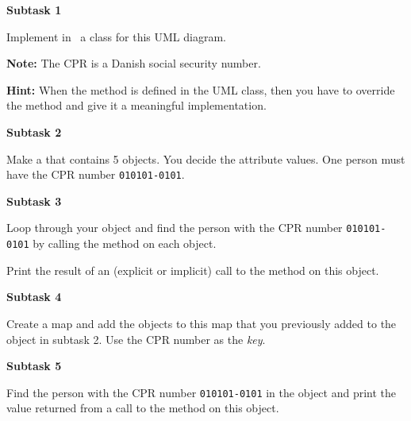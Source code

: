 \textbf{Subtask 1}

Implement in \csharp\ a class for this UML diagram.

\begin{center}
\end{center}

\textbf{Note:} The CPR is a Danish social security number.

\textbf{Hint:} When the  method is defined in the UML class, then you have to override the method and give it a meaningful implementation.

\textbf{Subtask 2}

Make a  that contains 5  objects. You decide the attribute values. One person must have the CPR number \texttt{010101-0101}.

\textbf{Subtask 3}

Loop through your  object and find the person with the CPR number \texttt{010101-0101} by calling the method  on each object.

Print the result of an (explicit or implicit) call to the  method on this object.

\textbf{Subtask 4}

Create a  map and add the  objects to this map that you previously added to the  object in subtask 2. Use the CPR number as the \textsl{key}.

\textbf{Subtask 5}

Find the person with the CPR number \texttt{010101-0101} in the  object and print the value returned from a call to the  method on this object.
